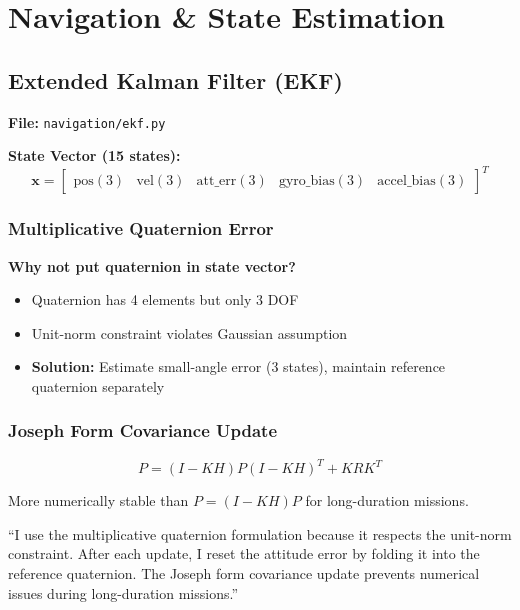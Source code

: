 \documentclass[11pt,a4paper]{article}
\begin{document}
\section{Navigation \& State Estimation}

\subsection{Extended Kalman Filter (EKF)}

\textbf{File:} \texttt{navigation/ekf.py}

\textbf{State Vector (15 states):}
\[
\mathbf{x} = \begin{bmatrix} \text{pos}(3) & \text{vel}(3) & \text{att\_err}(3) & \text{gyro\_bias}(3) & \text{accel\_bias}(3) \end{bmatrix}^T
\]

\subsubsection{Multiplicative Quaternion Error}

\textbf{Why not put quaternion in state vector?}
\begin{itemize}[noitemsep]
    \item Quaternion has 4 elements but only 3 DOF
    \item Unit-norm constraint violates Gaussian assumption
    \item \textbf{Solution:} Estimate small-angle error (3 states), maintain reference quaternion separately
\end{itemize}

\subsubsection{Joseph Form Covariance Update}

\begin{keyequation}
\[
P = (I - KH)P(I - KH)^T + KRK^T
\]
\end{keyequation}

More numerically stable than $P = (I-KH)P$ for long-duration missions.

\begin{interviewanswer}
``I use the multiplicative quaternion formulation because it respects the unit-norm constraint. After each update, I reset the attitude error by folding it into the reference quaternion. The Joseph form covariance update prevents numerical issues during long-duration missions.''
\end{interviewanswer}
\end{document}
